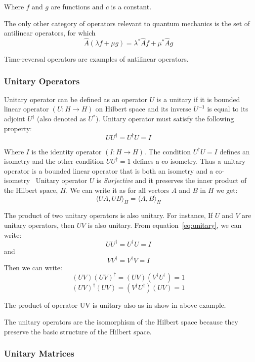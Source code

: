 Where $f$ and $g$ are functions and $c$ is a constant.

The only other category of operators relevant to quantum mechanics is the set of antilinear operators, for which
\begin{equation}
  \hat{A}(\lambda f + \mu g) = \lambda^{*}\hat{A}f + \mu^{*}\hat{A}g
  \label{eq:antilinear}
\end{equation}

Time-reversal operators are examples of antilinear operators.


\subsubsection{Unitary Operators}
Unitary operator can be defined as an operator $U$ is a unitary if it is bounded linear operator $( U : H \rightarrow H )$ on Hilbert space and its inverse $U^{-1}$ is equal to its adjoint $U^{\dagger}$ (also denoted as $U^*$).
Unitary operator must satisfy the following property:
\begin{equation}
  UU^{\dagger} = U^{\dagger}U = I
  \label{eq:unitary}
\end{equation}

Where $I$ is the identity operator $(I: H \rightarrow H)$. The condition $U^{\dagger}U = I$ defines an isometry and the other condition $UU^{\dagger} = 1$ defines a co-isometry. Thus a unitary operator is a bounded linear operator that is both an isometry and a co-isometry~\cite{halmos2012hilbertspaceproblem} Unitary operator $U$ is \textit{Surjective} and it preserves the inner product of the Hilbert space, $H$. We can write it as for all vectors $A$ and $B$ in $H$ we get: $$\langle UA, UB \rangle_{H} = \langle A, B \rangle_{H}$$

The product of two unitary operators is also unitary. For instance, If $U$ and $V$ are unitary operators, then $UV$ is also unitary. From equation~\ref{eq:unitary}, we can write: $$ UU^{\dagger} = U^{\dagger}U = I$$ and $$ VV^{\dagger} = V^{\dagger}V = I$$ Then we can write:
  $$(UV)(UV)^{\dagger} = (UV)(V^{\dagger}U^{\dagger}) = 1$$
  $$(UV)^{\dagger}(UV) = (V^{\dagger}U^{\dagger})(UV) = 1$$

The product of operator UV is unitary also as in show in above example.

The unitary operators are the isomorphism of the Hilbert space because they preserve the basic structure of the Hilbert space. 

\subsubsection{Unitary Matrices}

